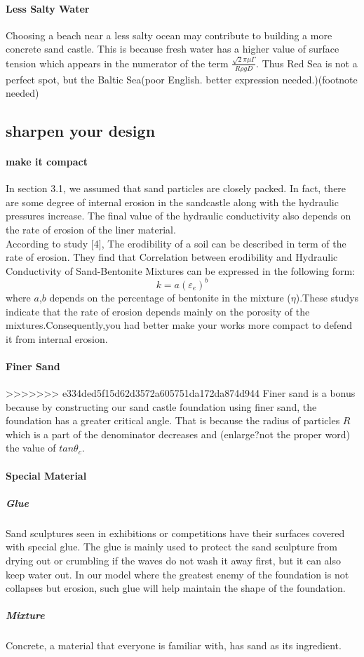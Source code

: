 \documentclass[12pt]{article}
\begin{document}
\paragraph{Less Salty Water}
Choosing a beach near a less salty ocean may contribute to building a more concrete sand castle. This is because fresh water has a higher value of surface tension which appears in the numerator of the term $\frac{\sqrt{2}\pi\mu\Gamma}{R\rho gD}$. Thus Red Sea is not a perfect spot, but the Baltic Sea(poor English. better expression needed.)(footnote needed)
\subsection{sharpen your design}
\paragraph{make it compact}
In section 3.1, we assumed that sand particles are closely packed. In fact, there are some degree of internal erosion in the sandcastle along with the hydraulic pressures increase. The final value of the hydraulic conductivity also depends on the rate of erosion of the liner material.\\
According to study [4], The erodibility of a soil can be described in term of the rate of erosion. They find that Correlation between erodibility and Hydraulic Conductivity of Sand-Bentonite Mixtures can be expressed in the following form:
$$
    k = a(\varepsilon_e)^b
$$
where $a$,$b$ depends on the percentage of bentonite in the mixture ($\eta$).These studys indicate that the rate of erosion depends mainly on the porosity of the mixtures.Consequently,you had better make your works more compact to defend it from internal erosion.
\paragraph{Finer Sand}
>>>>>>> e334ded5f15d62d3572a605751da172da874d944
Finer sand is a bonus because by constructing our sand castle foundation using finer sand, the foundation has a greater critical angle. That is because the radius of particles $R$ which is a part of the denominator decreases and (enlarge?not the proper word) the value of $tan\theta_c$.
\paragraph{Special Material}
\subparagraph{Glue}
Sand sculptures seen in exhibitions or competitions have their surfaces covered with special glue. The glue is mainly used to protect the sand sculpture from drying out or crumbling if the waves do not wash it away first, but it can also keep water out. In our model where the greatest enemy of the foundation is not collapses but erosion, such glue will help maintain the shape of the foundation.
\subparagraph{Mixture}
Concrete, a material that everyone is familiar with, has sand as its ingredient.
\end{document}
